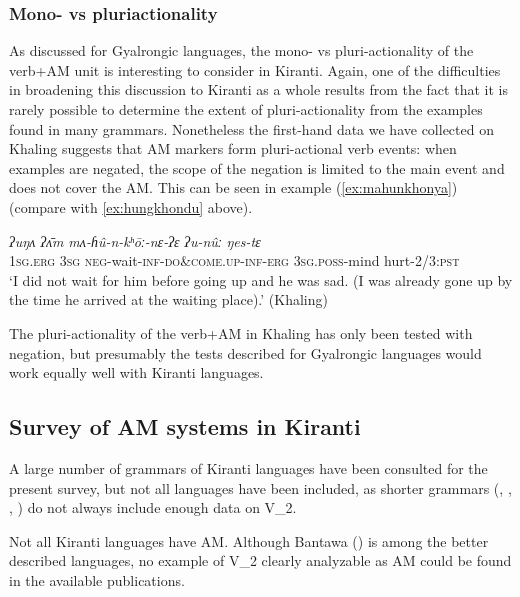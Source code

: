 \documentclass[oneside,a4paper,11pt]{article}
\newcommand{\ipa}[1]{{\phon\textit{#1}}}
\newcommand{\rouge}[1]{{\color{red}#1}}
\begin{document}
  
\subsubsection{Mono- vs pluriactionality} \label{sec:khaling.pluriactionality}

As discussed for Gyalrongic languages, the mono- vs pluri-actionality of the verb+AM unit is interesting to consider in Kiranti.  Again, one of the difficulties in broadening this discussion to Kiranti as a whole results from the fact that it is rarely possible to determine the extent of pluri-actionality from the examples found in many grammars.  Nonetheless the first-hand data we have collected on Khaling suggests that AM markers form pluri-actional verb events: when examples are negated, the scope of the negation is limited to the main event and does not cover the AM. This can be seen in example (\ref{ex:mahunkhonya}) (compare with \ref{ex:hungkhondu} above). 

\begin{exe}
\ex \label{ex:mahunkhonya}
 \gll
\ipa{ʔuŋʌ} \ipa{ʔʌ̄m} \ipa{mʌ-ɦû-n-\rouge{kʰōː}-nɛ-ʔɛ} \ipa{ʔu-nûː} \ipa{ŋes-tɛ} \\
\textsc{1sg}.\textsc{erg} \textsc{3sg} \textsc{neg}-wait-\textsc{inf}-\rouge{\textsc{do\&come.up}}-\textsc{inf}-\textsc{erg} \textsc{3sg}.\textsc{poss}-mind hurt-2/3:\textsc{pst} \\
\glt `I did not wait for him before going up and he was sad. (I was already gone up by the time he arrived at the waiting place).'  (Khaling)
\end{exe}

 

The pluri-actionality of the verb+AM in Khaling has only been tested with negation, but presumably the tests described for Gyalrongic languages would work equally well with Kiranti languages.

\subsection{Survey of AM systems in Kiranti}

A large number of grammars of Kiranti languages have been consulted for the present survey, but not all languages have been included, as shorter grammars  (\citealt{ebert97athpare}, \citealt{ebert97camling}, \citealt{opgenort05jero}, \citealt{tolsma06kulung}) do not always include enough data on V_2. 

Not all Kiranti languages have AM. Although Bantawa (\citealt{doornenbal09}) is among the better described languages, no example of V_2 clearly analyzable as AM could be found in the available publications.
\end{document}
